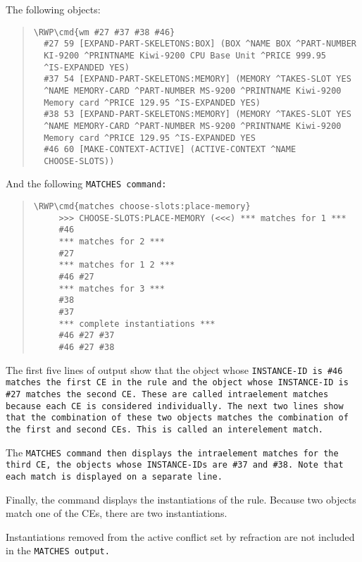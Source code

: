 The following objects:

\begin{quote}
\begin{Verbatim}[commandchars=\\\{\}]
\RWP\cmd{wm #27 #37 #38 #46}
  #27 59 [EXPAND-PART-SKELETONS:BOX] (BOX ^NAME BOX ^PART-NUMBER
  KI-9200 ^PRINTNAME Kiwi-9200 CPU Base Unit ^PRICE 999.95
  ^IS-EXPANDED YES)
  #37 54 [EXPAND-PART-SKELETONS:MEMORY] (MEMORY ^TAKES-SLOT YES
  ^NAME MEMORY-CARD ^PART-NUMBER MS-9200 ^PRINTNAME Kiwi-9200
  Memory card ^PRICE 129.95 ^IS-EXPANDED YES)
  #38 53 [EXPAND-PART-SKELETONS:MEMORY] (MEMORY ^TAKES-SLOT YES
  ^NAME MEMORY-CARD ^PART-NUMBER MS-9200 ^PRINTNAME Kiwi-9200
  Memory card ^PRICE 129.95 ^IS-EXPANDED YES
  #46 60 [MAKE-CONTEXT-ACTIVE] (ACTIVE-CONTEXT ^NAME
  CHOOSE-SLOTS))
\end{Verbatim}
\end{quote}

And the following \tt{MATCHES} command:

\begin{quote}
\begin{Verbatim}[commandchars=\\\{\}]
\RWP\cmd{matches choose-slots:place-memory}
     >>> CHOOSE-SLOTS:PLACE-MEMORY (<<<) *** matches for 1 ***
     #46
     *** matches for 2 ***
     #27
     *** matches for 1 2 ***
     #46 #27
     *** matches for 3 ***
     #38
     #37
     *** complete instantiations ***
     #46 #27 #37
     #46 #27 #38
\end{Verbatim}
\end{quote}

The first five lines of output show that the object whose
\tt{INSTANCE-ID} is \verb|#46| matches the first CE in the rule and
the object whose \tt{INSTANCE-ID} is \verb|#27| matches the second
CE. These are called intraelement matches because each CE is
considered individually. The next two lines show that the combination
of these two objects matches the combination of the first and second
CEs. This is called an interelement match.

The \tt{MATCHES} command then displays the intraelement matches for
the third CE, the objects whose \tt{INSTANCE-ID}s are \verb|#37| and
\verb|#38|.  Note that each match is displayed on a separate line.

Finally, the command displays the instantiations of the rule.  Because
two objects match one of the CEs, there are two instantiations.

Instantiations removed from the active conflict set by refraction are
not included in the \tt{MATCHES} output.

